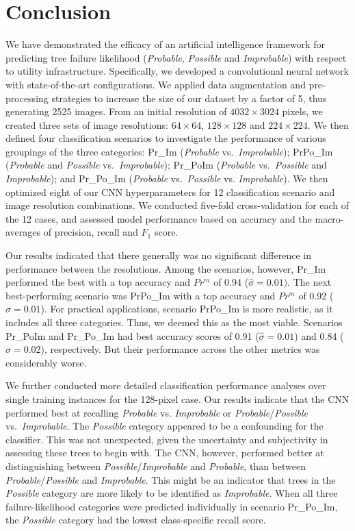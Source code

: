 \documentclass[Journal, letterpaper, DoubleSpace, InsideFigs]{ascelike-new}
\begin{document}
\section{Conclusion}
We have demonstrated the efficacy of an artificial intelligence framework for predicting tree failure likelihood
(\textit{Probable}, \textit{Possible} and \textit{Improbable}) with respect to utility infrastructure. Specifically, we
developed a convolutional neural network with state-of-the-art configurations.  We applied data augmentation and
pre-processing strategies to increase the size of our dataset by a factor of 5, thus generating 2525 images.  From an
initial resolution of $4032 \times 3024$ pixels, we created three sets of image resolutions: $64 \times 64$,
$128 \times 128$ and $224 \times 224$. We then defined four classification scenarios to investigate the performance of
various groupings of the three categories: Pr\_Im (\textit{Probable} vs.\ \textit{Improbable}); PrPo\_Im
(\textit{Probable} and \textit{Possible} vs.\ \textit{Improbable}); Pr\_PoIm (\textit{Probable} vs.\ \textit{Possible}
and \textit{Improbable}); and Pr\_Po\_Im (\textit{Probable} vs.\ \textit{Possible} vs. \textit{Improbable}).
We then optimized eight of our CNN hyperparameters for 12 classification
scenario and image resolution combinations.  We conducted five-fold cross-validation for each of the 12 cases, and
assessed model performance based on accuracy and the macro-averages of precision, recall and $F_{1}$ score.

Our results indicated that there generally was no significant difference in performance between the resolutions.  Among
the scenarios, however, Pr\_Im performed the best with a top accuracy and $Pr^{m}$ of 0.94 ($\hat\sigma = 0.01)$.
The next best-performing scenario was PrPo\_Im with a top accuracy and $Pr^{m}$ of 0.92 ($\hat\sigma = 0.01$).  For
practical applications, scenario PrPo\_Im is more realistic, as it includes all three categories.  Thus, we deemed this
as the most viable.  Scenarios Pr\_PoIm and Pr\_Po\_Im had best accuracy scores of 0.91 ($\hat\sigma = 0.01$) and 0.84
($\hat\sigma = 0.02$), respectively.  But their performance across the other metrics was considerably worse.

We further conducted more detailed classification performance analyses over single training instances for the 128-pixel
case.  Our results indicate that the CNN performed best at recalling \textit{Probable} vs. \textit{Improbable} or
\textit{Probable}/\textit{Possible} vs.\ \textit{Improbable}.  The \textit{Possible} category appeared to be a
confounding for the classifier.  This was not unexpected, given the uncertainty and subjectivity in assessing these trees
to begin with.  The CNN, however, performed better at distinguishing between \textit{Possible}/\textit{Improbable} and
\textit{Probable}, than between \textit{Probable}/\textit{Possible} and \textit{Improbable}.  This might be an indicator
that trees in the \textit{Possible} category are more likely to be identified as \textit{Improbable}.  When all three
failure-likelihood categories were predicted individually in scenario Pr\_Po\_Im, the \textit{Possible} category had the
lowest class-specific recall score.
\end{document}

